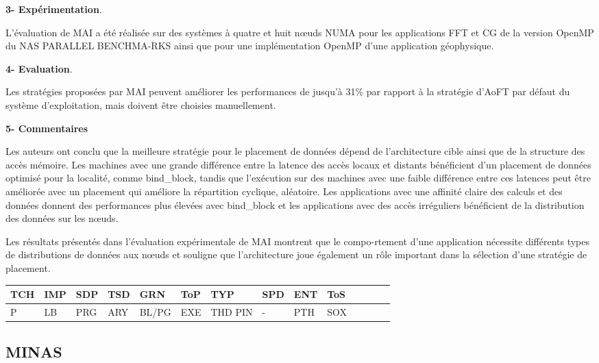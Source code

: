 \textbf{3- Expérimentation}.

L'évaluation de MAI a été réalisée sur des systèmes à quatre et huit nœuds NUMA pour les applications FFT et CG de la version OpenMP du NAS PARALLEL BENCHMA-RKS ainsi que pour une implémentation OpenMP d'une application géophysique.

\textbf{4- Evaluation}. 

Les stratégies proposées par MAI peuvent améliorer les performances de jusqu'à 31\% par rapport à la stratégie d’AoFT par défaut du système d'exploitation, mais doivent être choisies manuellement. 

\textbf{5- Commentaires}

Les auteurs ont conclu que la meilleure stratégie pour le placement de données dépend de l'architecture cible ainsi que de la structure des accès mémoire. 
Les machines avec une grande différence entre la latence des accès locaux et distants bénéficient d'un placement de données optimisé pour la localité, comme bind\_block, 
tandis que l'exécution sur des machines avec une faible différence entre ces latences peut être améliorée avec un placement qui améliore la répartition cyclique, aléatoire. 
Les applications avec une affinité claire des calculs et des données donnent des performances plus élevées avec bind\_block et 
les applications avec des accès irréguliers bénéficient de la distribution des données sur les nœuds. 

Les résultats présentés dans l'évaluation expérimentale de MAI montrent que le compo-rtement d'une application nécessite différents types de distributions de données aux nœuds et souligne que l'architecture joue également un rôle important dans la sélection d'une stratégie de placement.
%
\begin{center}%
\begin{tabular}{l *{13}{l}} 		\hline
{TCH} & {IMP} 	& {SDP} 	&  {TSD} 	& {GRN} 	& {ToP} 	& {TYP} 	& {SPD}	& {ENT} 	& {ToS} \\     		\hline
P     	& LB		& PRG		&  ARY 	& BL/PG	& EXE		& THD PIN	& - 		& PTH   	& SOX  \\     		          \hline
\end{tabular}
\end{center}
%
\subsection{MINAS}

